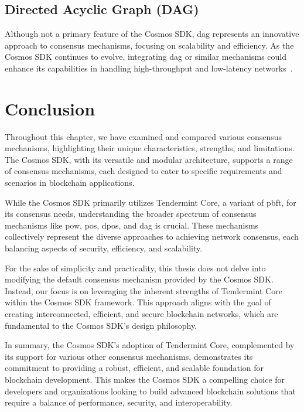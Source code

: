 \subsection{Directed Acyclic Graph (DAG)}

Although not a primary feature of the Cosmos SDK, \gls{dag} represents an innovative approach to consensus mechanisms, focusing on scalability and efficiency. As the Cosmos SDK continues to evolve, integrating \gls{dag} or similar mechanisms could enhance its capabilities in handling high-throughput and low-latency networks~\cite{lewenberg2015inclusive}.

\section{Conclusion}

Throughout this chapter, we have examined and compared various consensus mechanisms, highlighting their unique characteristics, strengths, and limitations. The Cosmos SDK, with its versatile and modular architecture, supports a range of consensus mechanisms, each designed to cater to specific requirements and scenarios in blockchain applications.

While the Cosmos SDK primarily utilizes Tendermint Core, a variant of \gls{pbft}, for its consensus needs, understanding the broader spectrum of consensus mechanisms like \gls{pow}, \gls{pos}, \gls{dpos}, and \gls{dag} is crucial. These mechanisms collectively represent the diverse approaches to achieving network consensus, each balancing aspects of security, efficiency, and scalability.

For the sake of simplicity and practicality, this thesis does not delve into modifying the default consensus mechanism provided by the Cosmos SDK. Instead, our focus is on leveraging the inherent strengths of Tendermint Core within the Cosmos SDK framework. This approach aligns with the goal of creating interconnected, efficient, and secure blockchain networks, which are fundamental to the Cosmos SDK's design philosophy.

In summary, the Cosmos SDK's adoption of Tendermint Core, complemented by its support for various other consensus mechanisms, demonstrates its commitment to providing a robust, efficient, and scalable foundation for blockchain development. This makes the Cosmos SDK a compelling choice for developers and organizations looking to build advanced blockchain solutions that require a balance of performance, security, and interoperability.

